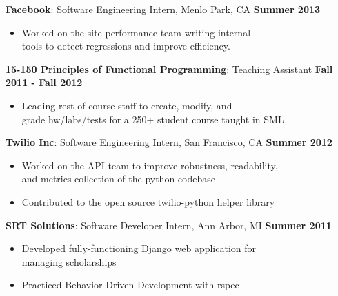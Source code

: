 \documentclass[sectioned]{dsyangres}
\begin{document}
\begin{resume}
\textbf{Facebook}: Software Engineering Intern,
Menlo Park, CA \hfill \textbf{Summer 2013}
  \begin{itemize} \itemsep -2pt
    \item Worked on the site performance team writing internal \\
      tools to detect regressions and improve efficiency.
  \end{itemize}

\textbf{15-150 Principles of Functional
 Programming}: Teaching Assistant \hfill \textbf{Fall 2011 - Fall 2012}
 \begin{itemize} \itemsep -2pt
   \item Leading rest of course staff to create, modify, and\\
     grade hw/labs/tests for a 250+ student course taught in SML
 \end{itemize}

\textbf{Twilio Inc}: Software Engineering Intern,
 San Francisco, CA \hfill \textbf{Summer 2012}
  \begin{itemize} \itemsep -2pt
    \item Worked on the API team to improve robustness, readability, \\
      and metrics collection of the python codebase
    \item Contributed to the open source twilio-python helper library
  \end{itemize}

\textbf{SRT Solutions}: Software Developer Intern,
  Ann Arbor, MI \hfill \textbf{Summer 2011}
  \begin{itemize} \itemsep -2pt
    \item Developed fully-functioning Django web application for\\
      managing scholarships
    \item Practiced Behavior Driven Development with rspec
  \end{itemize}




\end{resume}
\end{document}
